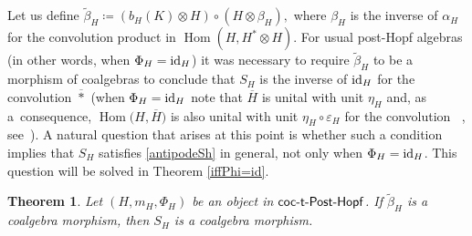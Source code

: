 \documentclass[pdftex]{sigma}
\numberwithin{equation}{section}
\newtheorem{Theorem}{Theorem}[section]
\DeclareMathOperator{\barast}{\,\overline{\ast}\,}
\DeclareMathOperator{\Hom}{Hom}
\begin{document}
Let us define $\tilde{\beta}_{H}\coloneqq\left( b_{H}(K)\otimes H\right)\circ(H\otimes\beta_{H}),$
where $\beta_{H}$ is the inverse of $\alpha_{H}$ for the convolution product in $\Hom(H,H^{\ast}\otimes H)$. For usual post-Hopf algebras (in other words, when $\Phi_{H}={\rm id}_{H}$) it was necessary to require $\tilde{\beta}_{H}$ to be a morphism of coalgebras to conclude that $S_{H}$ is the inverse of ${\rm id}_{H}$ for the convolution $\overline{\ast}$ \big(when $\Phi_{H}={\rm id}_{H}$ note that $\overline{H}$ is unital with unit $\eta_{H}$ and, as a~consequence, $\Hom\bigl(H,\overline{H}\bigr)$ is also unital with unit $\eta_{H}\circ\varepsilon_{H}$ for the convolution $\barast$, see~\mbox{\cite[Lemma~3.13 and Theorem~3.14]{FGR}}\big). A natural question that arises at this point is whether such a condition implies that $S_{H}$ satisfies \eqref{antipodeSh} in general, not only when $\Phi_{H}={\rm id}_{H}$. This question will be solved in Theorem \ref{iffPhi=id}.
\begin{Theorem}
Let $(H,m_{H},\Phi_{H})$ be an object in $\sf{coc}\textnormal{-}\sf{t}\textnormal{-}\sf{Post}\textnormal{-}\sf{Hopf}$. If $\tilde{\beta}_{H}$ is a coalgebra morphism, then $S_{H}$ is a coalgebra morphism.
\end{Theorem}
\end{document}
